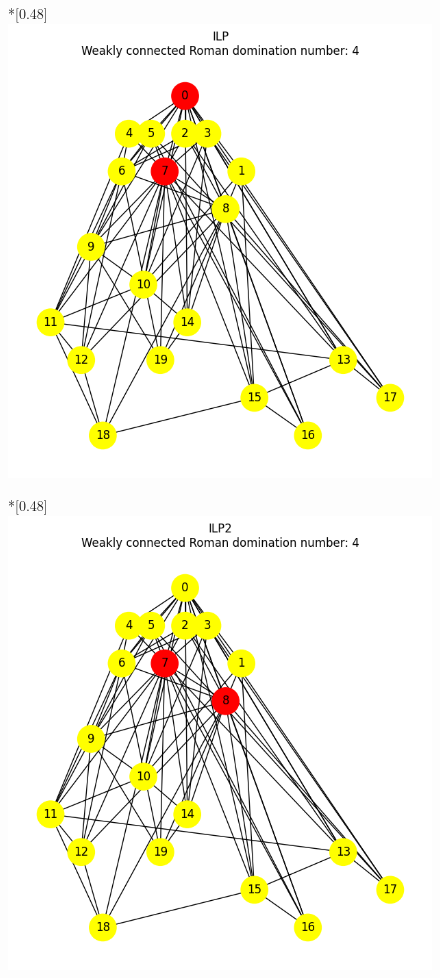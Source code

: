     \begin{figure}[H]
        \centering
        \begin{subcaptionbox}*{}[0.48\linewidth]
            {\includegraphics[width=0.75\linewidth]{assets/plots/ILP/ScaleFree_n20_i2_results.png}}
        \end{subcaptionbox}
        \hfill
        \begin{subcaptionbox}*{}[0.48\linewidth]
            {\includegraphics[width=0.75\linewidth]{assets/plots/ILP2/ScaleFree_n20_i2_results.png}}
        \end{subcaptionbox}
        \hfill

\end{figure}
